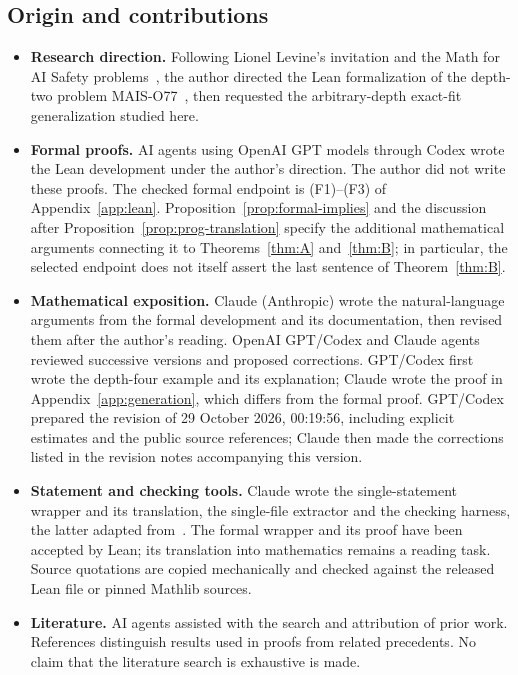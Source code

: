 \documentclass[11pt,a4paper]{article}
\theoremstyle{definition}
\theoremstyle{remark}
\numberwithin{equation}{section}
\begin{document}
\subsection*{Origin and contributions}
\begin{itemize}
\item \textbf{Research direction.} Following Lionel Levine's invitation and the Math for AI Safety problems~\cite{levine-mais,mais-repo}, the author directed the Lean formalization of the depth-two problem MAIS-O77~\cite{mais-o77,feld-o77}, then requested the arbitrary-depth exact-fit generalization studied here.
\item \textbf{Formal proofs.} AI agents using OpenAI GPT models through Codex wrote the Lean development under the author's direction. The author did not write these proofs. The checked formal endpoint is (F1)--(F3) of Appendix~\ref{app:lean}. Proposition~\ref{prop:formal-implies} and the discussion after Proposition~\ref{prop:prog-translation} specify the additional mathematical arguments connecting it to Theorems~\ref{thm:A} and~\ref{thm:B}; in particular, the selected endpoint does not itself assert the last sentence of Theorem~\ref{thm:B}.
\item \textbf{Mathematical exposition.} Claude (Anthropic) wrote the natural-language arguments from the formal development and its documentation, then revised them after the author's reading. OpenAI GPT/Codex and Claude agents reviewed successive versions and proposed corrections. GPT/Codex first wrote the depth-four example and its explanation; Claude wrote the proof in Appendix~\ref{app:generation}, which differs from the formal proof. GPT/Codex prepared the revision of 29 October 2026, 00:19:56, including explicit estimates and the public source references; Claude then made the corrections listed in the revision notes accompanying this version.
\item \textbf{Statement and checking tools.} Claude wrote the single-statement wrapper and its translation, the single-file extractor and the checking harness, the latter adapted from~\cite{feld-o77}. The formal wrapper and its proof have been accepted by Lean; its translation into mathematics remains a reading task. Source quotations are copied mechanically and checked against the released Lean file or pinned Mathlib sources.
\item \textbf{Literature.} AI agents assisted with the search and attribution of prior work. References distinguish results used in proofs from related precedents. No claim that the literature search is exhaustive is made.
\end{itemize}
\end{document}
